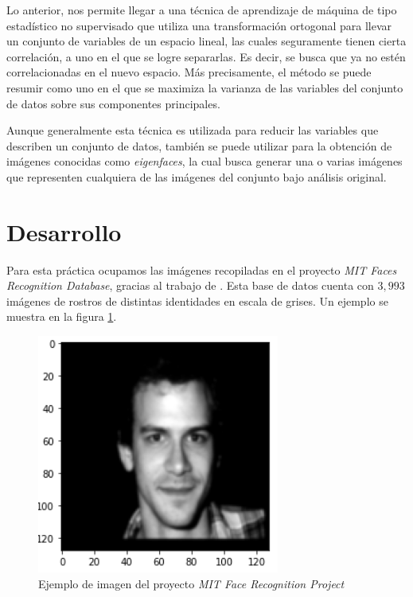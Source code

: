 \documentclass[conference]{IEEEtran}
\begin{document}
Lo anterior, nos permite llegar a una técnica de aprendizaje de máquina de tipo estadístico no supervisado que utiliza una transformación ortogonal para llevar un conjunto de variables de un espacio lineal, las cuales seguramente tienen cierta correlación, a uno en el que se logre separarlas. Es decir, se busca que ya no estén correlacionadas en el nuevo espacio. Más precisamente, el método se puede resumir como uno en el que se maximiza la varianza de las variables del conjunto de datos sobre sus componentes principales.

Aunque generalmente esta técnica es utilizada para reducir las variables que describen un conjunto de datos, también se puede utilizar para la obtención de imágenes conocidas como \textit{eigenfaces}, la cual busca generar una o varias imágenes que representen cualquiera de las imágenes del conjunto bajo análisis original.


\section{Desarrollo}

Para esta práctica ocupamos las imágenes recopiladas en el proyecto \textit{MIT Faces Recognition Database}, gracias al trabajo de \cite{szummer}. Esta base de datos cuenta con $3,993$ imágenes de rostros de distintas identidades en escala de grises. Un ejemplo se muestra en la figura \ref{fig:face_1000}.

\begin{figure}[H]
    \centering
    \includegraphics[scale=0.3]{imgs/face_1000.png}
    \caption{Ejemplo de imagen del proyecto \textit{MIT Face Recognition Project}}
    \label{fig:face_1000}
\end{figure}
\end{document}
